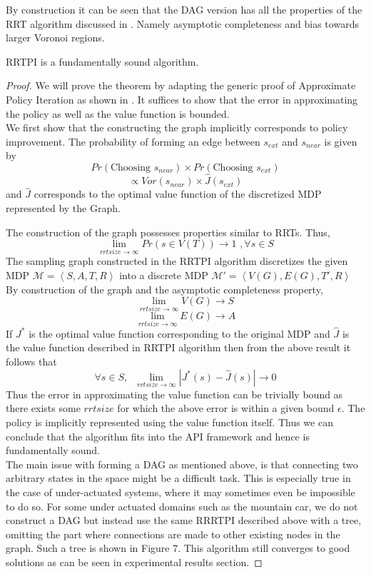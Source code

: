 \documentclass[wcp]{jmlr}
\begin{document}
By construction it can be seen that the DAG version has all the properties of the RRT algorithm discussed in . Namely asymptotic completeness and bias towards larger Voronoi regions.
\begin{theorem}
RRTPI is a fundamentally sound algorithm.
\end{theorem}
\begin{proof}
We will prove the theorem by adapting the generic proof of Approximate Policy Iteration as shown in . It suffices to show that the error in approximating the policy as well as the value function is bounded. \\
We first show that the constructing the graph implicitly corresponds to policy improvement. The probability of forming an edge between $s_{ext}$ and $s_{near}$ is given by 
\[ Pr(\text{Choosing }s_{near}) \times Pr(\text{Choosing }s_{ext}) \]
\[ \varpropto Vor(s_{near})\times \hat{J}(s_{ext}) \] and $\hat{J}$ corresponds to the optimal value function of the discretized MDP represented by the Graph.

The construction of the graph possesses properties similar to RRTs. Thus,\\
\[ \lim_{rrtsize \rightarrow \infty } Pr(s\in V(T)) \rightarrow 1\,\,, \forall s\in S \] 
The sampling graph constructed in the RRTPI algorithm discretizes the given MDP $\mathcal{M}=\left\langle S,A,T,R \right\rangle $ into a discrete MDP $\mathcal{M'}=\left\langle V(G),E(G),T',R \right\rangle $ By construction of the graph and the asymptotic completeness property,
\[ \lim_{rrtsize \rightarrow \infty } V(G) \rightarrow S \]
\[ \lim_{rrtsize \rightarrow \infty } E(G) \rightarrow A \]
If $J^*$ is the optimal value function corresponding to the original MDP and $\hat{J}$ is the value function described in RRTPI algorithm then from the above result it follows that
\[  \forall s \in S,\;\; \lim_{rrtsize \rightarrow \infty } |J^*(s)- \hat{J}(s) | \rightarrow 0 \]
Thus the error in approximating the value function can be trivially bound as there exists some $rrtsize$ for which the above error is within a given bound $\epsilon$. The policy is implicitly represented using the value function itself. Thus we can conclude that the algorithm fits into the API framework and hence is fundamentally sound.\\

 The main issue with forming a DAG as mentioned above, is that connecting two arbitrary states in the space might be a difficult task. This is especially true in the case of under-actuated systems, where it may sometimes even be impossible to do so. For some under actuated domains such as the mountain car, we do not construct a DAG but instead use the same RRRTPI described above with a tree,  omitting the part where connections are made to other existing nodes in the graph. Such a tree is shown in Figure 7. This algorithm still converges to good solutions as can be seen in experimental results section.
\end{proof}
\end{document}
